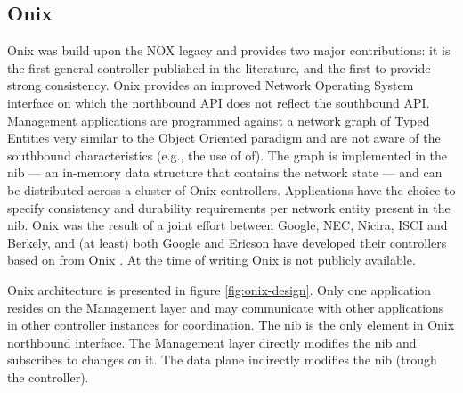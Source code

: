 

\subsection{Onix}
\label{sec:related:onix}

Onix \cite{Koponen:2010th}  was build upon the NOX legacy and provides two major contributions: it is the first general controller published in the literature, and the first to provide strong consistency.  
Onix  provides an improved Network Operating System interface on  which the northbound API does not reflect the southbound API. 
Management applications are programmed against a network graph of Typed Entities very similar to the Object Oriented paradigm and are not aware of the southbound characteristics (e.g., the use of \gls{of}). 
The graph is implemented in  the \gls{nib}  --- an in-memory data structure that contains the network state ---  and can be distributed across a  cluster of  Onix controllers. 
Applications have the choice to specify consistency and durability requirements  per network entity  present in the \gls{nib}.  
Onix was the result of a joint effort between Google, NEC, Nicira, ISCI and Berkely, and (at least)  both Google and Ericson have developed their controllers based on from Onix \cite{The-Valley-of-the-Nerd.:fk}. 
At the time of writing Onix is not publicly available. 

Onix architecture is presented in figure \ref{fig:onix-design}. 
Only one application resides on the  Management layer and may communicate with other applications in other controller instances for coordination. 
The \gls{nib} is the only element in Onix northbound interface. 
The Management layer directly modifies the \gls{nib} and subscribes to changes on it. 
The data plane  indirectly modifies the \gls{nib} (trough the controller).


